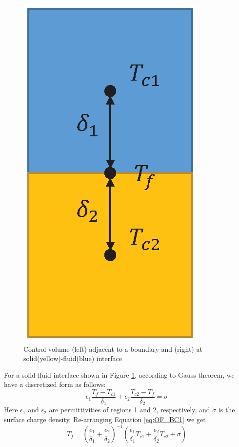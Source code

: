 \begin{figure}[h]
\includegraphics[scale=0.5]{openfoam/CV.eps}
\caption{Control volume (left) adjacent to a boundary and (right) at solid(yellow)-fluid(blue) interface}
\label{fig:CV}
\end{figure}


For a solid-fluid interface shown in Figure \ref{fig:CV}, according to Gauss theorem, we have a discretized form as follows:
\begin{equation}
\epsilon_1 \frac{T_f-T_{c1}}{\delta_1} + \epsilon_2 \frac{T_{c2}-T_f}{\delta_2} = \sigma
\label{eq:OF_BC1}
\end{equation}
Here $\epsilon_1$ and $\epsilon_2$ are permittivities of regions 1 and 2, respectively, and $\sigma$ is the surface charge density. Re-arranging Equation \ref{eq:OF_BC1} we get
\begin{equation}
T_f = \left(\frac{\epsilon_1}{\delta_1}+\frac{\epsilon_2}{\delta_2}\right)^{-1} \left( \frac{\epsilon_1}{\delta_1}T_{c1}+\frac{\epsilon_2}{\delta_2}T_{c2}+\sigma\right)
\label{eq:OF_BC2}
\end{equation}

